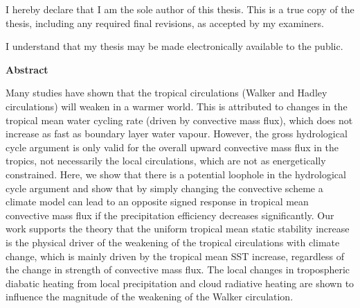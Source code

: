 \cleardoublepage %
 


  \noindent
I hereby declare that I am the sole author of this thesis. This is a true copy of the thesis, including any required final revisions, as accepted by my examiners.

  \bigskip
  
  \noindent
I understand that my thesis may be made electronically available to the public.

\cleardoublepage


\begin{center}\textbf{Abstract}\end{center}

Many studies have shown that the tropical circulations (Walker and Hadley circulations) will weaken in a warmer world. This is attributed to changes in the tropical mean water cycling rate (driven by convective mass flux), which does not increase as fast as boundary layer water vapour. However, the gross hydrological cycle argument is only valid for the overall upward convective mass flux in the tropics, not necessarily the local circulations, which are not as energetically constrained. Here, we show that there is a potential loophole in the hydrological cycle argument and show that by simply changing the convective scheme a climate model can lead to an opposite signed response in tropical mean convective mass flux if the precipitation efficiency decreases significantly. Our work supports the theory that the uniform tropical mean static stability increase is the physical driver of the weakening of the tropical circulations with climate change, which is mainly driven by the tropical mean SST increase, regardless of the change in strength of convective mass flux. The local changes in tropospheric diabatic heating from local precipitation and cloud radiative heating are shown to influence the magnitude of the weakening of the Walker circulation.

